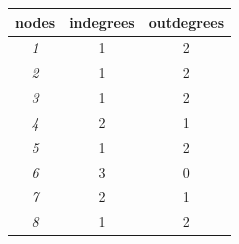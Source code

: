 \documentclass{report}
\begin{document}
\begin{enumerate}[2.1]
\begin{enumerate}[(a)]
\begin{table}[h]
\begin{tabular}{|c|c|c|}
            \end{tabular}
            \end{table}
        \begin{table}[h!]
                \centering
                \begin{tabular}{c|c|c|}
                \hline
                \multicolumn{1}{|c|}{\textbf{nodes}} & \textbf{indegrees} & \textbf{outdegrees} \\ \hline
                \multicolumn{1}{|c|}{\textit{1}}     & 1                  & 2                   \\ \hline
                \multicolumn{1}{|c|}{\textit{2}}     & 1                  & 2                   \\ \hline
                \multicolumn{1}{|c|}{\textit{3}}     & 1                  & 2                   \\ \hline
                \multicolumn{1}{|c|}{\textit{4}}     & 2                  & 1                   \\ \hline
                \multicolumn{1}{|c|}{\textit{5}}     & 1                  & 2                   \\ \hline
                \multicolumn{1}{|c|}{\textit{6}}     & 3                  & 0                   \\ \hline
                \multicolumn{1}{|c|}{\textit{7}}     & 2                  & 1                   \\ \hline
                \multicolumn{1}{|c|}{\textit{8}}     & 1                  & 2                   \\ \hline
                

\end{tabular}
\end{table}
\end{enumerate}
\end{enumerate}
\end{document}
